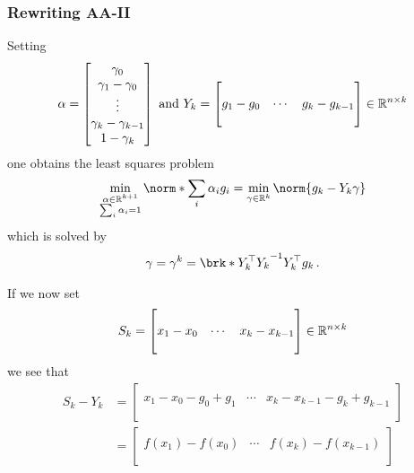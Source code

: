 \begin{frame}
	\frametitle{Rewriting AA-II}
	Setting 
	\begin{align*}
		\alpha=\begin{bmatrix} \gamma_0 \\ \gamma_1-\gamma_0 \\ \vdots \\ \gamma_{k}-\gamma_{k-1} \\ 1-\gamma_k \end{bmatrix}
		\text{ and }
		Y_k = \begin{bmatrix}
			& & \\
			g_{1}-g_0 & \cdots & g_{k}-g_{k-1} \\
			& &
		\end{bmatrix} \in\mathbb{R}^{n\times k}
	\end{align*}
	one obtains the least squares problem
	\begin{align*}
		\min_{\substack{\alpha\in\R^{k+1} \\ \sum_i\alpha_i=1}}\norm*{\sum_i\alpha_ig_i}
		= \min_{\gamma \in\R^k}\norm{g_k-Y_k\gamma}
	\end{align*}
	which is solved by
	\begin{align*}
		\gamma= \gamma^k = \brk*{Y_k^\top Y_k}^{-1}Y_k^\top g_k\,.
	\end{align*}
\end{frame}

\begin{frame}
	If we now set
	\begin{align*}
		S_k = \begin{bmatrix}
			& & \\
			x_1-x_0 & \cdots & x_{k}-x_{k-1} \\
			& & \\
		\end{bmatrix} \in\mathbb{R}^{n\times k}
	\end{align*}
	we see that
	\begin{align*}
		S_k -Y_k &= \begin{bmatrix}
			& & \\
			x_1-x_0-g_0+g_1 & \cdots & x_{k}-x_{k-1}-g_{k}+g_{k-1} \\
			& & \\
		\end{bmatrix} \\
		&= \begin{bmatrix}
			& & \\
			f(x_1)-f(x_0) & \cdots & f(x_{k})-f(x_{k-1}) \\
			& & \\
		\end{bmatrix}
	\end{align*}
\end{frame}

